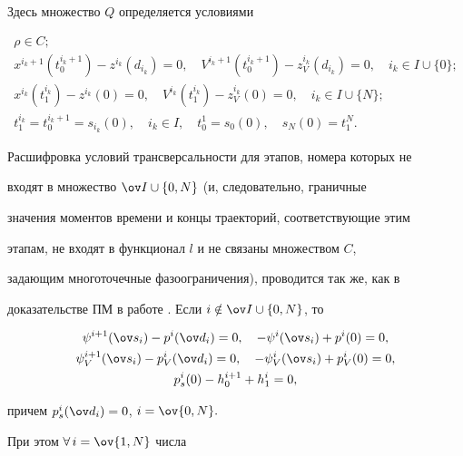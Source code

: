 Здесь множество $Q$ определяется условиями


\begin{gather*}


\rho\in C;\\


x^{i_k+1}(t_0^{i_k+1})-z^{i_k}(d_{i_k})=0, \quad


V^{i_k+1}(t_0^{i_k+1})-z_V^{i_k}(d_{i_k})=0, \quad i_k\in


I\cup\{0\};\\


x^{i_k}(t_1^{i_k})-z^{i_k}(0)=0, \quad


V^{i_k}(t_1^{i_k})-z_V^{i_k}(0)=0,\quad i_k\in I\cup\{N\};\\


t_1^{i_k}=t_0^{i_k+1}=s_{i_k}(0),\quad i_k\in I, \quad t_0^1=


s_0(0),\quad s_N(0) =t_1^{N}.


\end{gather*}





Расшифровка условий трансверсальности для этапов, номера которых не


входят в множество $\ov I\cup\{0,N\}$ (и, следовательно, граничные


значения моментов времени и концы траекторий, соответствующие этим


этапам, не входят в функционал $l$ и не связаны множеством $C$,


задающим многоточечные фазоограничения), проводится так же, как в


доказательстве ПМ в работе \cite{DS99}. Если $i\notin \ov I\cup


\{0,N\}$, то


\begin{gather*}


\psi^{i+1}(\ov s_i)-p^i(\ov d_i)=0,\quad -\psi^i(\ov


s_i)+p^i(0)=0,\\


\psi_V^{i+1}(\ov s_i)-p_V^i(\ov d_i)=0,\quad -\psi_V^i(\ov


s_i)+p_V^i(0)=0,\\


p_s^i(0)-h_0^{i+1}+h_1^i=0,


\end{gather*}


причем $p_s^i(\ov d_i)=0$, $i=\ov{0,N}.$


При этом $\forall\, i=\ov{1,N}$ числа


